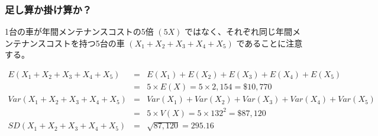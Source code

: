 \begin{frame}[shrink=25]
\frametitle{足し算か掛け算か？}


1台の車が年間メンテナンスコストの5倍 $(5X)$ ではなく、それぞれ同じ年間メンテナンスコストを持つ5台の車 $(X_1 + X_2 + X_3 + X_4 + X_5)$ であることに注意する。

{\small
\begin{eqnarray*}
E(X_1 + X_2 + X_3 + X_4 + X_5) &=& E(X_1) + E(X_2) + E(X_3) + E(X_4) + E(X_5) \\
&=& 5 \times E(X) = 5 \times 2,154 = \$ 10,770 \\
Var(X_1 + X_2 + X_3 + X_4 + X_5) &=& Var(X_1) + Var(X_2) + Var(X_3) + Var(X_4) + Var(X_5) \\
&=& 5 \times V(X) = 5 \times 132^2 = \$ 87,120 \\
SD(X_1 + X_2 + X_3 + X_4 + X_5) &=& \sqrt{87,120} =  295.16
\end{eqnarray*}
}

\end{frame}

